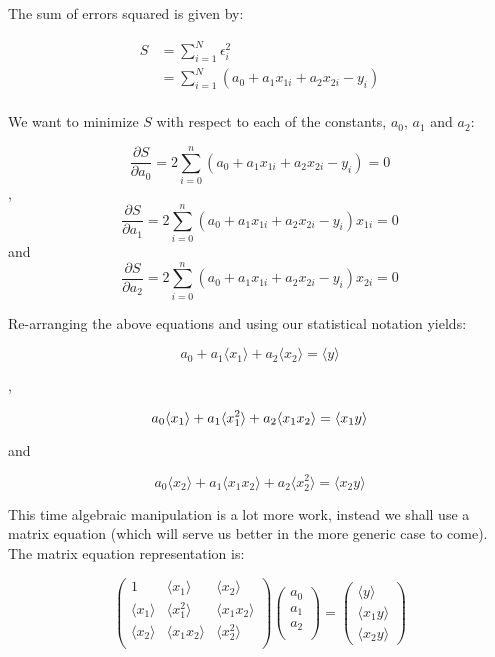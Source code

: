 \documentclass[11pt]{article}
\begin{document}
The sum of errors squared is given by:

\[
\begin{align*}
S &= \sum_{i = 1}^N \epsilon_i^2 \\
  &= \sum_{i=1}^N (a_0 + a_1 x_{1i} + a_2 x_{2i} - y_i)\\
\end{align*}
\]

We want to minimize \(S\) with respect to each of the constants,
\(a_0\), \(a_1\) and \(a_2\):

\[
\frac{\partial S}{\partial a_0} = 2 \sum_{i=0}^n (a_0 + a_1x_{1i} + a_2x_{2i} - y_i) = 0
\] , \[
\frac{\partial S}{\partial a_1} = 2 \sum_{i=0}^n (a_0 + a_1x_{1i} + a_2x_{2i} - y_i)x_{1i} = 0
\] and \[
\frac{\partial S}{\partial a_2} = 2 \sum_{i=0}^n (a_0 + a_1x_{1i} + a_2x_{2i} - y_i)x_{2i} = 0
\]





    Re-arranging the above equations and using our statistical notation
yields:

\[
a_0 + a_1 \langle x_1 \rangle + a_2 \langle x_2 \rangle = \langle y \rangle
\]

,

\[
a_0\langle x_1\rangle + a_1\langle x_1^2\rangle + a_2\langle x_1x_2 \rangle = \langle x_1y \rangle\\
\]

and

\[
a_0\langle x_2\rangle + a_1\langle x_1x_2\rangle + a_2\langle x_2^2\rangle = \langle x_2y\rangle
\]

This time algebraic manipulation is a lot more work, instead we shall
use a matrix equation (which will serve us better in the more generic
case to come). The matrix equation representation is:

\[
\begin{pmatrix}
  1     &\langle x_1\rangle     &\langle{x_2}\rangle\\
  \langle{x_1}\rangle   &\langle{x_1^2}\rangle      &\langle{x_1x_2}\rangle\\
  \langle{x_2}\rangle   &\langle{x_1x_2}\rangle &\langle{x_2^2}\rangle\\
 \end{pmatrix}
  \begin{pmatrix}
  a_0\\
  a_1\\
  a_2\\
 \end{pmatrix}
 = 
 \begin{pmatrix}
  \langle{y}\rangle\\
  \langle{x_1 y}\rangle\\
  \langle{x_2 y}\rangle
 \end{pmatrix}
\]
\end{document}
